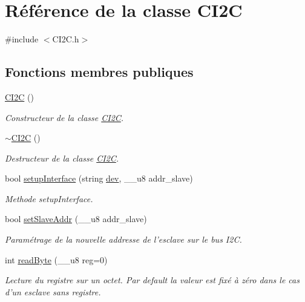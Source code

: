\hypertarget{class_c_i2_c}{\section{Référence de la classe C\+I2\+C}
\label{class_c_i2_c}
}


{\ttfamily \#include $<$C\+I2\+C.\+h$>$}

\subsection*{Fonctions membres publiques}
\begin{DoxyCompactItemize}
\item 
\hyperlink{class_c_i2_c_a2df83a2627a8b8bf91460a68372c9ed5}{C\+I2\+C} ()
\begin{DoxyCompactList}\small\item\em Constructeur de la classe \hyperlink{class_c_i2_c}{C\+I2\+C}. \end{DoxyCompactList}\item 
\hyperlink{class_c_i2_c_ae757710bb84ab327217092f0af851a16}{$\sim$\+C\+I2\+C} ()
\begin{DoxyCompactList}\small\item\em Destructeur de la classe \hyperlink{class_c_i2_c}{C\+I2\+C}. \end{DoxyCompactList}\item 
bool \hyperlink{class_c_i2_c_a81c326c1f0fe2d148cf41e980cf52d26}{setup\+Interface} (string \hyperlink{class_c_i2_c_ae2d4648eadc2acae86a49cecbf39ce56}{dev}, \+\_\+\+\_\+u8 addr\+\_\+slave)
\begin{DoxyCompactList}\small\item\em Methode setup\+Interface. \end{DoxyCompactList}\item 
bool \hyperlink{class_c_i2_c_acad42c3e7d1046f569f720592eeaa5b1}{set\+Slave\+Addr} (\+\_\+\+\_\+u8 addr\+\_\+slave)
\begin{DoxyCompactList}\small\item\em Paramétrage de la nouvelle addresse de l'esclave sur le bus I2\+C. \end{DoxyCompactList}\item 
int \hyperlink{class_c_i2_c_afb589b9bdefa75257807b4e6ac2c1c5a}{read\+Byte} (\+\_\+\+\_\+u8 reg=0)
\begin{DoxyCompactList}\small\item\em Lecture du registre sur un octet. Par default la valeur est fixé à zéro dans le cas d'un esclave sans registre. \end{DoxyCompactList}\item 

\end{DoxyCompactItemize}
